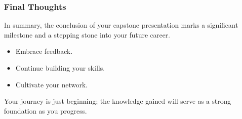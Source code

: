 \documentclass{beamer}
\begin{document}
\begin{frame}[fragile]
    \frametitle{Final Thoughts}
    In summary, the conclusion of your capstone presentation marks a significant milestone and a stepping stone into your future career.
    
    \begin{itemize}
        \item Embrace feedback.
        \item Continue building your skills.
        \item Cultivate your network.
    \end{itemize}
    
    Your journey is just beginning; the knowledge gained will serve as a strong foundation as you progress. 
\end{frame}
\end{document}
